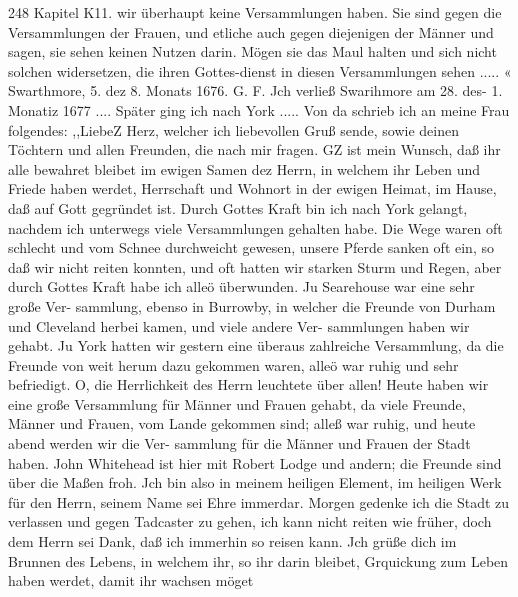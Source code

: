 248 Kapitel K11.
wir überhaupt keine Versammlungen haben. Sie sind gegen die
Versammlungen der Frauen, und etliche auch gegen diejenigen
der Männer und sagen, sie sehen keinen Nutzen darin. Mögen
sie das Maul halten und sich nicht solchen widersetzen, die ihren
Gottes-dienst in diesen Versammlungen sehen ..... «
Swarthmore, 5. dez 8. Monats 1676. G. F.
Jch verließ Swarihmore am 28. des- 1. Monatiz 1677 ....
Später ging ich nach York ..... Von da schrieb ich an meine
Frau folgendes:
,,LiebeZ Herz,
welcher ich liebevollen Gruß sende, sowie deinen Töchtern und
allen Freunden, die nach mir fragen. GZ ist mein Wunsch, daß
ihr alle bewahret bleibet im ewigen Samen dez Herrn, in welchem
ihr Leben und Friede haben werdet, Herrschaft und Wohnort in
der ewigen Heimat, im Hause, daß auf Gott gegründet ist. Durch
Gottes Kraft bin ich nach York gelangt, nachdem ich unterwegs
viele Versammlungen gehalten habe. Die Wege waren oft
schlecht und vom Schnee durchweicht gewesen, unsere Pferde
sanken oft ein, so daß wir nicht reiten konnten, und oft hatten
wir starken Sturm und Regen, aber durch Gottes Kraft habe ich
alleö überwunden. Ju Searehouse war eine sehr große Ver-
sammlung, ebenso in Burrowby, in welcher die Freunde von
Durham und Cleveland herbei kamen, und viele andere Ver-
sammlungen haben wir gehabt. Ju York hatten wir gestern eine
überaus zahlreiche Versammlung, da die Freunde von weit herum
dazu gekommen waren, alleö war ruhig und sehr befriedigt.
O, die Herrlichkeit des Herrn leuchtete über allen! Heute haben
wir eine große Versammlung für Männer und Frauen gehabt,
da viele Freunde, Männer und Frauen, vom Lande gekommen
sind; alleß war ruhig, und heute abend werden wir die Ver-
sammlung für die Männer und Frauen der Stadt haben. John
Whitehead ist hier mit Robert Lodge und andern; die Freunde
sind über die Maßen froh. Jch bin also in meinem heiligen
Element, im heiligen Werk für den Herrn, seinem Name sei Ehre
immerdar. Morgen gedenke ich die Stadt zu verlassen und gegen
Tadcaster zu gehen, ich kann nicht reiten wie früher, doch dem
Herrn sei Dank, daß ich immerhin so reisen kann. Jch grüße
dich im Brunnen des Lebens, in welchem ihr, so ihr darin bleibet,
Grquickung zum Leben haben werdet, damit ihr wachsen möget


